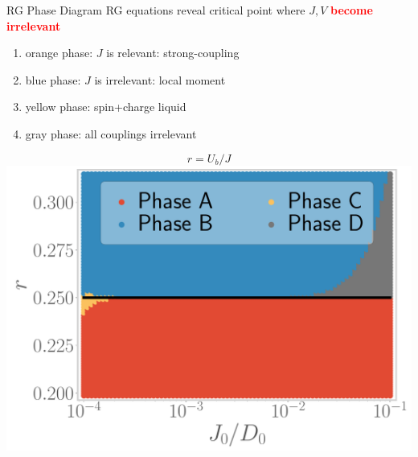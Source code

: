 \documentclass[11pt,aspectratio=169]{beamer}
\newcommand{\focus}[1]{\textcolor{red}{\bf{#1}}}
\begin{document}
\begin{frame}{RG Phase Diagram}
RG equations reveal critical point where \(J,V\) \focus{become irrelevant}\\[10pt]

\hspace*{-20pt}
\begin{minipage}{0.52\textwidth}
\begin{enumerate}
	\item orange phase: \(J\) is relevant: strong-coupling\\[20pt]
	\item blue phase: \(J\) is irrelevant: local moment\\[20pt]
	\item yellow phase: spin+charge liquid\\[20pt]
	\item gray phase: all couplings irrelevant
\end{enumerate}
\end{minipage}
\begin{minipage}{0.5\textwidth}
	\[r = U_b/J\]
	\includegraphics[width=\textwidth]{phase-map-MIT.pdf}
\end{minipage}

\end{frame}
\end{document}
